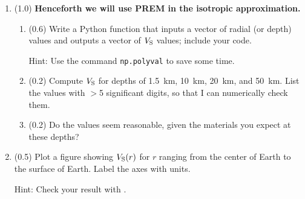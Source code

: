 \documentclass[11pt,titlepage,fleqn]{article}
\begin{document}
\begin{enumerate}
\item (1.0) {\bf Henceforth we will use PREM in the isotropic approximation.}


\begin{enumerate}
\item (0.6) Write a Python function that inputs a vector of radial (or depth) values and outputs a vector of $V_{\rm S}$ values; include your code.

Hint: Use the command \verb+np.polyval+ to save some time.

\item (0.2) Compute $V_{\rm S}$ for depths of 1.5~km, 10~km, 20~km, and 50~km.
%
List the values with $>$5 significant digits, so that I can numerically check them.

\item (0.2) Do the values seem reasonable, given the materials you expect at these depths?
\end{enumerate}


\item (0.5) Plot a figure showing $V_{\rm S}(r)$ for $r$ ranging from the center of Earth to the surface of Earth. Label the axes with units.

Hint: Check your result with \citet[][Figure~1.1]{ShearerE2}.



\end{enumerate}
\end{document}
